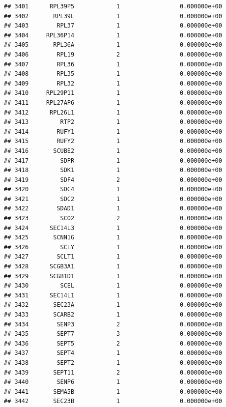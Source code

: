 \documentclass[
]{article}
\begin{document}
\begin{verbatim}
## 3401      RPL39P5            1                 0.000000e+00
## 3402       RPL39L            1                 0.000000e+00
## 3403        RPL37            1                 0.000000e+00
## 3404     RPL36P14            1                 0.000000e+00
## 3405       RPL36A            1                 0.000000e+00
## 3406        RPL19            2                 0.000000e+00
## 3407        RPL36            1                 0.000000e+00
## 3408        RPL35            1                 0.000000e+00
## 3409        RPL32            1                 0.000000e+00
## 3410     RPL29P11            1                 0.000000e+00
## 3411     RPL27AP6            1                 0.000000e+00
## 3412      RPL26L1            1                 0.000000e+00
## 3413         RTP2            1                 0.000000e+00
## 3414        RUFY1            1                 0.000000e+00
## 3415        RUFY2            1                 0.000000e+00
## 3416       SCUBE2            1                 0.000000e+00
## 3417         SDPR            1                 0.000000e+00
## 3418         SDK1            1                 0.000000e+00
## 3419         SDF4            2                 0.000000e+00
## 3420         SDC4            1                 0.000000e+00
## 3421         SDC2            1                 0.000000e+00
## 3422        SDAD1            1                 0.000000e+00
## 3423         SCO2            2                 0.000000e+00
## 3424      SEC14L3            1                 0.000000e+00
## 3425       SCNN1G            1                 0.000000e+00
## 3426         SCLY            1                 0.000000e+00
## 3427        SCLT1            1                 0.000000e+00
## 3428      SCGB3A1            1                 0.000000e+00
## 3429      SCGB1D1            1                 0.000000e+00
## 3430         SCEL            1                 0.000000e+00
## 3431      SEC14L1            1                 0.000000e+00
## 3432       SEC23A            1                 0.000000e+00
## 3433       SCARB2            1                 0.000000e+00
## 3434        SENP3            2                 0.000000e+00
## 3435        SEPT7            3                 0.000000e+00
## 3436        SEPT5            2                 0.000000e+00
## 3437        SEPT4            1                 0.000000e+00
## 3438        SEPT2            1                 0.000000e+00
## 3439       SEPT11            2                 0.000000e+00
## 3440        SENP6            1                 0.000000e+00
## 3441       SEMA5B            1                 0.000000e+00
## 3442       SEC23B            1                 0.000000e+00

\end{verbatim}
\end{document}
